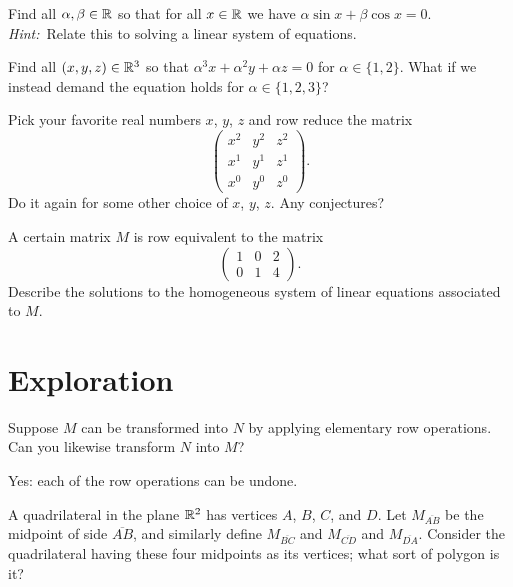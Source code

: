 \documentclass{homework}
\begin{document}
\begin{problem}\label{sin-cos-linear-system}Find all $\alpha, \beta \in \mathbb{R}$ so that for all $x \in \mathbb{R}$ we have $\alpha \sin x + \beta \cos x = 0$.  \textit{Hint:}~Relate this to solving a linear system of equations.
\end{problem}

\begin{problem}
  Find all $(x,y,z) \in \mathbb{R}^3$ so that $\alpha^3 x + \alpha^2 y + \alpha z = 0$ for $\alpha \in \{1,2\}$.  What if we instead demand the equation holds for $\alpha \in \{1,2,3\}$?
\end{problem}

\begin{problem}\label{vandermonde-introduction}Pick your favorite real numbers $x$, $y$, $z$ and row reduce the matrix
  \[
    \begin{pmatrix}
      x^2 & y^2 & z^2 \\
      x^1 & y^1 & z^1 \\
      x^0 & y^0 & z^0            
    \end{pmatrix}.
  \]
  Do it again for some other choice of $x$, $y$, $z$.  Any conjectures?
\end{problem}

\begin{problem}
  A certain matrix $M$ is row equivalent to the matrix
  \[
    \begin{pmatrix}
      1 & 0 & 2 \\
      0 & 1 & 4
    \end{pmatrix}.
  \]
  Describe the solutions to the homogeneous system of linear equations
  associated to $M$.
\end{problem}

\section{Exploration}

\begin{problem}
  Suppose $M$ can be transformed into $N$ by applying elementary row
  operations.  Can you likewise transform $N$ into $M$?
\end{problem}

\begin{solution}
  Yes: each of the row operations can be undone.
\end{solution}

\begin{problem}\label{exploration:quadrilateral-midpoints}
  A quadrilateral in the plane $\mathbb{R}^2$ has vertices $A$, $B$, $C$, and
  $D$.  Let $M_{\overline{AB}}$ be the midpoint of side
  $\overline{AB}$, and similarly define $M_{\overline{BC}}$ and
  $M_{\overline{CD}}$ and $M_{\overline{DA}}$.  Consider the
  quadrilateral having these four midpoints as its vertices; what sort
  of polygon is it?
\end{problem}
\end{document}

